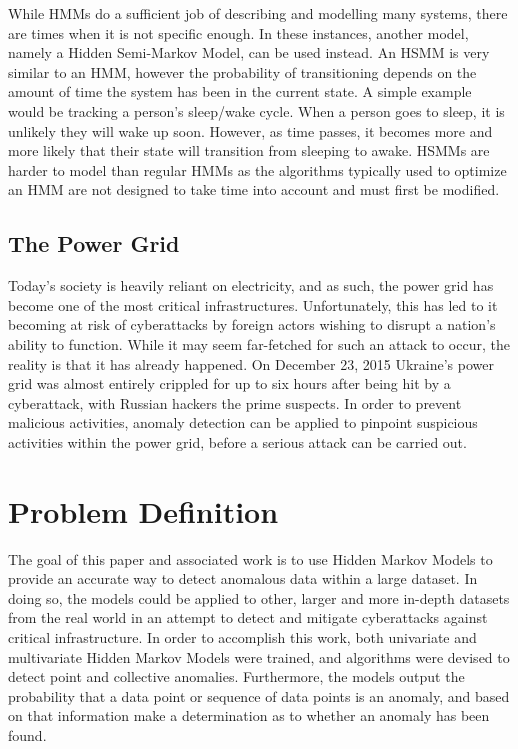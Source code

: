 \documentclass[letterpaper, 11pt]{article}%
\begin{document}
While HMMs do a sufficient job of describing and modelling many systems, there are times when it is not specific enough. In these instances, another model, namely a Hidden Semi-Markov Model, can be used instead. An HSMM is very similar to an HMM, however the probability of transitioning depends on the amount of time the system has been in the current state. A simple example would be tracking a person's sleep/wake cycle. When a person goes to sleep, it is unlikely they will wake up soon. However, as time passes, it becomes more and more likely that their state will transition from sleeping to awake. HSMMs are harder to model than regular HMMs as the algorithms typically used to optimize an HMM are not designed to take time into account and must first be modified.

\subsection{The Power Grid}
Today's society is heavily reliant on electricity, and as such, the power grid has become one of the most critical infrastructures. Unfortunately, this has led to it becoming at risk of cyberattacks by foreign actors wishing to disrupt a nation's ability to function. While it may seem far-fetched for such an attack to occur, the reality is that it has already happened. On December 23, 2015 Ukraine's power grid was almost entirely crippled for up to six hours after being hit by a cyberattack, with Russian hackers the prime suspects\cite{ukraine}. In order to prevent malicious activities, anomaly detection can be applied to pinpoint suspicious activities within the power grid, before a serious attack can be carried out.

\section{Problem Definition}
The goal of this paper and associated work is to use Hidden Markov Models to provide an accurate way to detect anomalous data within a large dataset. In doing so, the models could be applied to other, larger and more in-depth datasets from the real world in an attempt to detect and mitigate cyberattacks against critical infrastructure. In order to accomplish this work, both univariate and multivariate Hidden Markov Models were trained, and algorithms were devised to detect point and collective anomalies. Furthermore, the models output the probability that a data point or sequence of data points is an anomaly, and based on that information make a determination as to whether an anomaly has been found.
\end{document}
